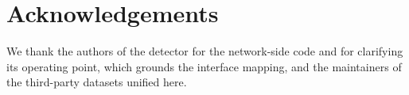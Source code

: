 \ifanon\else

\section*{Acknowledgements}
We thank the authors of the  detector for the network-side code
and for clarifying its operating point, which grounds the interface mapping, and
the maintainers of the third-party datasets unified here.
\fi





